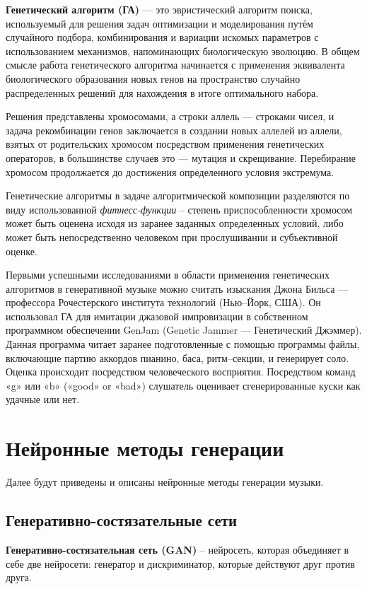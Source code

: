 \textbf{Генетический алгоритм (ГА)} \cite{gen-alg} — это эвристический алгоритм поиска, используемый для решения задач оптимизации и моделирования путём случайного подбора, комбинирования и вариации искомых параметров с использованием механизмов, напоминающих биологическую эволюцию. В общем смысле работа генетического алгоритма начинается с применения эквивалента биологического образования новых генов на пространство случайно распределенных решений для нахождения в итоге оптимального набора. 

Решения представлены хромосомами, а строки аллель — строками чисел, и задача рекомбинации генов заключается в создании новых аллелей из аллели, взятых от родительских хромосом посредством применения генетических операторов, в большинстве случаев это — мутация и скрещивание. Перебирание хромосом продолжается до достижения определенного условия экстремума. 

Генетические алгоритмы в задаче алгоритмической композиции разделяются по виду использованной \textit{фитнесс-функции} -- степень приспособленности хромосом может быть оценена исходя из заранее заданных определенных условий, либо может быть непосредственно человеком при прослушивании и субъективной оценке.

Первыми успешными исследованиями в области применения генетических алгоритмов в генеративной музыке можно считать изыскания Джона Бильса — профессора Рочестерского института технологий (Нью–Йорк, США). Он использовал ГА для имитации джазовой импровизации в собственном программном обеспечении GenJam \cite{gen-alg} (Genetic Jammer — Генетический Джэммер). Данная программа читает заранее подготовленные с помощью программы файлы, включающие партию аккордов пианино, баса, ритм–секции, и генерирует соло. Оценка происходит посредством человеческого восприятия. Посредством команд «g» или «b» («good» or «bad») слушатель оценивает сгенерированные куски как удачные или нет.


\section{Нейронные методы генерации}

Далее будут приведены и описаны нейронные методы генерации музыки.

\subsection{Генеративно-состязательные сети}

\textbf{Генеративно-состязательная сеть (GAN)} \cite{gan} -- нейросеть, которая объединяет в себе две нейросети: генератор и дискриминатор, которые действуют друг против друга.

